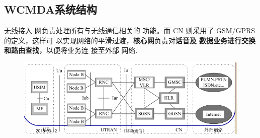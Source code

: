\subsection{WCMDA系统结构}
无线接入 网负责处理所有与无线通信相关的
功能。而 CN 则采用了 GSM/GPRS 的定义，这样可
以实现网络的平滑过渡，\textbf{核心网}负责对\textbf{话音及
数据业务进行交换和路由查找}，以便将业务连
接至外部 网络.
\begin{figure}[H]
	\centering
	\includegraphics[width=0.7\linewidth]{figures/screenshot011}
	\caption{}
	\label{fig:screenshot011}
\end{figure}
